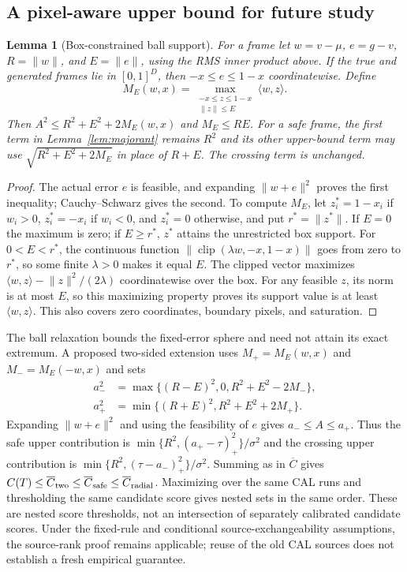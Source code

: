 \documentclass[11pt]{article}
\theoremstyle{noteplain}
\newtheorem{lemma}{Lemma}
\newcommand{\norm}[1]{\lVert #1\rVert}
\newcommand{\ip}[2]{\langle #1,#2\rangle}
\begin{document}
\subsection*{A pixel-aware upper bound for future study}
\begin{lemma}[Box-constrained ball support]\label{lem:box}
For a frame let $w=v-\mu$, $e=g-v$, $R=\norm w$, and $E=\norm e$, using the RMS inner product above. If the true and generated frames lie in $[0,1]^D$, then $-x\le e\le1-x$ coordinatewise. Define
\[
 M_E(w,x)=\max_{\substack{-x\le z\le1-x\\\norm z\le E}}\ip{w}{z}.
\]
Then $A^2\le R^2+E^2+2M_E(w,x)$ and $M_E\le RE$. For a safe frame, the first term in Lemma~\ref{lem:majorant} remains $R^2$ and its other upper-bound term may use $\sqrt{R^2+E^2+2M_E}$ in place of $R+E$. The crossing term is unchanged.
\end{lemma}
\begin{proof}
The actual error $e$ is feasible, and expanding $\norm{w+e}^2$ proves the first inequality; Cauchy--Schwarz gives the second. To compute $M_E$, let $z_i^*=1-x_i$ if $w_i>0$, $z_i^*=-x_i$ if $w_i<0$, and $z_i^*=0$ otherwise, and put $r^*=\norm{z^*}$. If $E=0$ the maximum is zero; if $E\ge r^*$, $z^*$ attains the unrestricted box support. For $0<E<r^*$, the continuous function $\norm{\operatorname{clip}(\lambda w,-x,1-x)}$ goes from zero to $r^*$, so some finite $\lambda>0$ makes it equal $E$. The clipped vector maximizes $\ip{w}{z}-\norm z^2/(2\lambda)$ coordinatewise over the box. For any feasible $z$, its norm is at most $E$, so this maximizing property proves its support value is at least $\ip{w}{z}$. This also covers zero coordinates, boundary pixels, and saturation.
\end{proof}
The ball relaxation bounds the fixed-error sphere and need not attain its exact extremum. A proposed two-sided extension uses $M_+=M_E(w,x)$ and $M_-=M_E(-w,x)$ and sets
\begin{align*}
 a_-^2&=\max\{(R-E)^2,0,R^2+E^2-2M_-\},\\
 a_+^2&=\min\{(R+E)^2,R^2+E^2+2M_+\}.
\end{align*}
Expanding $\norm{w+e}^2$ and using the feasibility of $e$ gives $a_-\le A\le a_+$. Thus the safe upper contribution is $\min\{R^2,(a_+-\tau)_+^2\}/\sigma^2$ and the crossing upper contribution is $\min\{R^2,(\tau-a_-)_+^2\}/\sigma^2$. Summing as in $\overline C$ gives $C(T)\le\overline C_{\rm two}\le\overline C_{\rm safe}\le\overline C_{\rm radial}$. Maximizing over the same CAL runs and thresholding the same candidate score gives nested sets in the same order. These are nested score thresholds, not an intersection of separately calibrated candidate scores. Under the fixed-rule and conditional source-exchangeability assumptions, the source-rank proof remains applicable; reuse of the old CAL sources does not establish a fresh empirical guarantee.
\end{document}
